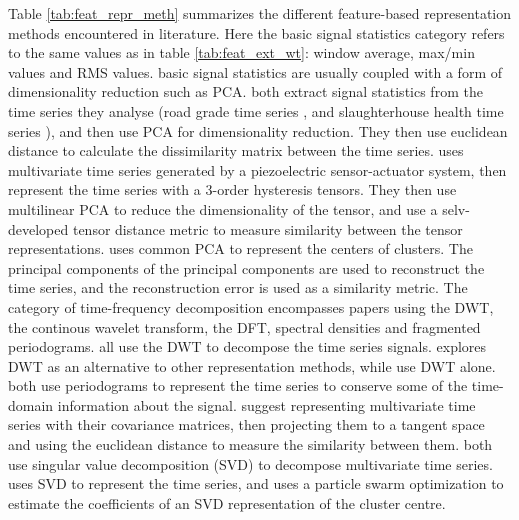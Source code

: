 Table \ref{tab:feat_repr_meth} summarizes the different feature-based representation methods encountered in literature. 
Here the basic signal statistics category refers to the same values as in table \ref{tab:feat_ext_wt}: window average, max/min values and RMS values.
basic signal statistics are usually coupled with a form of dimensionality reduction such as PCA. 
\textcite{tsc_slaughterhouse, road_grade_china_pca_kmeans} both extract signal statistics from the time series they analyse (road grade time series \cite{road_grade_china_pca_kmeans}, and slaughterhouse health time series \cite{tsc_slaughterhouse}),
and then use PCA for dimensionality reduction. They then use euclidean distance to calculate the dissimilarity matrix between the time series.
\textcite{hysteresis_tsc_tensor_decomp} uses multivariate time series generated by a piezoelectric sensor-actuator system, 
then represent the time series with a 3-order hysteresis tensors.
They then use multilinear PCA to reduce the dimensionality of the tensor, and use a selv-developed tensor distance metric to measure similarity between the tensor representations.
\textcite{multivariate_tsc_common_pca} uses common PCA to represent the centers of clusters.
The principal components of the principal components are used to reconstruct the time series, and the reconstruction error is used as a similarity metric.
The category of time-frequency decomposition encompasses papers using the DWT, the continous wavelet transform, the DFT, spectral densities and fragmented periodograms.
\textcite{shape_feat_mod_tsc_rfa, ambient_air_vape_k_means, dwt_hac_kmeans_som} all use the DWT to decompose the time series signals. 
\textcite{shape_feat_mod_tsc_rfa} explores DWT as an alternative to other representation methods, while \textcite{ambient_air_vape_k_means, dwt_hac_kmeans_som} use DWT alone.
\textcite{fragmented_periodogram, BSLEX_nonlin_nonstat_tsc} both use periodograms to represent the time series to conserve some of the time-domain information about the signal. 
\textcite{multivar_tsc_riemann_manifold} suggest representing multivariate time series with their covariance matrices, then projecting them to a tangent space and using the euclidean distance to measure the similarity between them.
\textcite{fuzzy_c_means_pso_svd, svd_birch_tsc_stock_price} both use singular value decomposition (SVD) to decompose multivariate time series. 
\textcite{fuzzy_c_means_pso_svd} uses SVD to represent the time series, and uses a particle swarm optimization to estimate the coefficients of an SVD representation of the cluster centre.
